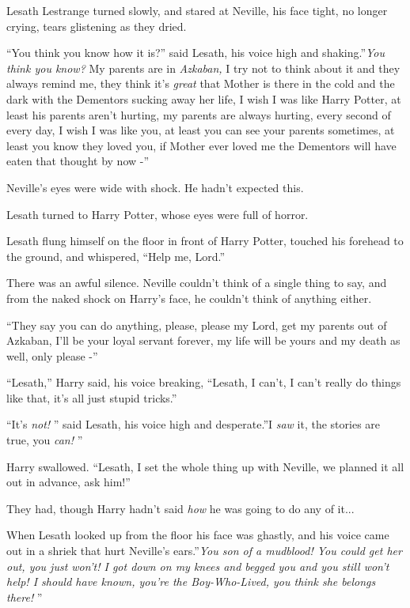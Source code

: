 Lesath Lestrange turned slowly, and stared at Neville, his face tight,
no longer crying, tears glistening as they dried.

``You think you know how it is?'' said Lesath, his voice high and
shaking.''\emph{You think you know?} My parents are in \emph{Azkaban,} I
try not to think about it and they always remind me, they think it's
\emph{great} that Mother is there in the cold and the dark with the
Dementors sucking away her life, I wish I was like Harry Potter, at
least his parents aren't hurting, my parents are always hurting, every
second of every day, I wish I was like you, at least you can see your
parents sometimes, at least you know they loved you, if Mother ever
loved me the Dementors will have eaten that thought by now -''

Neville's eyes were wide with shock. He hadn't expected this.

Lesath turned to Harry Potter, whose eyes were full of horror.

Lesath flung himself on the floor in front of Harry Potter, touched his
forehead to the ground, and whispered, ``Help me, Lord.''

There was an awful silence. Neville couldn't think of a single thing to
say, and from the naked shock on Harry's face, he couldn't think of
anything either.

``They say you can do anything, please, please my Lord, get my parents
out of Azkaban, I'll be your loyal servant forever, my life will be
yours and my death as well, only please -''

``Lesath,'' Harry said, his voice breaking, ``Lesath, I can't, I can't
really do things like that, it's all just stupid tricks.''

``It's \emph{not!} '' said Lesath, his voice high and desperate.''I
\emph{saw} it, the stories are true, you \emph{can!} ''

Harry swallowed. ``Lesath, I set the whole thing up with Neville, we
planned it all out in advance, ask him!''

They had, though Harry hadn't said \emph{how} he was going to do any of
it...

When Lesath looked up from the floor his face was ghastly, and his voice
came out in a shriek that hurt Neville's ears.''\emph{You son of a
mudblood! You could get her out, you just won't! I got down on my knees
and begged you and you still won't help! I should have known, you're the
Boy-Who-Lived, you think she belongs there!} ''

